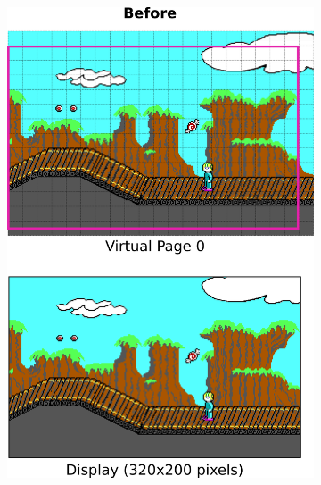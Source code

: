 \documentclass[book.tex]{subfiles}
\begin{document}
\begin{figure}[H]
\centering
\begin{subfigure}{.5\textwidth}
\centering
  \includegraphics[width=.95\linewidth]{screenshots_300dpi/game/Scroll_KC4_6_1.png}
\end{subfigure}%
\begin{subfigure}{.5\textwidth}
\centering

\end{subfigure}
\end{figure}
\end{document}
